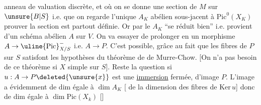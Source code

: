 anneau de valuation discrète, et où on se
donne une section  de $M$ sur $\unsure{B|S}$ i.e. que
on regarde l'unique $A_K$ abélien
sous-jacent à $\mathrm{Pic}^0(X_K)$\deleted{\unsure{,|$\ast$}}  prouver 
la section est partout définie. Or par le
 $A_K$ ``se réduit bien''
i.e. provient d'un schéma abélien $A$
sur $V$. On va essayer de prolonger
en un  morphisme $A\to\uline{\mathrm{Pic}}^{-}_{X/S}$
i.e. $A\to P$. C'est possible, grâce au
fait que les fibres de $P$ sur $S$ satisfont
les hypothèses du théorème de  
de Murre-Chow. [On n'a pas besoin de
ce théorème si $X$ simple sur $S$].
Reste la question si $u:A\to P\deleted{\unsure{x}}$ est une
\uline{immersion} fermée, d'image $P$. L'image a
 évidemment  de dim égale à $\dim A_K$ 
  [ de la dimension des fibres
de $\mathrm{Ker}\,u$] donc de dim égale à
$\dim\mathrm{Pic}(X_k)$ []

